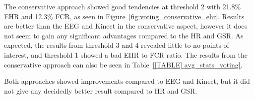 The conservative approach showed good tendencies at threshold 2 with 21.8\% EHR and 12.3\% FCR, as seen in Figure~\ref{fig:voting_conservative_ehr}.
Results are better than the EEG and Kinect in the conservative aspect, however it does not seem to gain any significant advantages compared to the HR and GSR.
As expected, the results from threshold 3 and 4 revealed little to no points of interest, and threshold 1 showed a bad EHR to FCR ratio. 
The results from the conservative approach can also be seen in Table~\ref{[TABLE] avg_stats_voting}.

Both approaches showed improvements compared to EEG and Kinect, but it did not give any decidedly better result compared
to HR and GSR.


